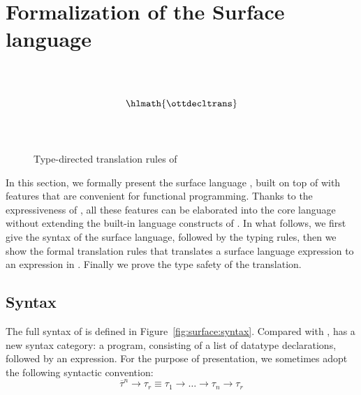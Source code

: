 \section{Formalization of the Surface language}
\label{sec:surface}

\begin{figure*}
\small
\centering
\renewcommand{\ottinterrule}{\\[1.0mm]}
\renewcommand{\ottdrule}[4][]{{\inferrule{#2 }{#3}\,\ottdrulename{#4}}}
\renewenvironment{ottdefnblock}[3][]{\raggedright \framebox{\mbox{#2}} \quad #3 \\[0pt]}{}
\renewcommand{\ottusedrule}[1]{$#1\quad$}
\ottdefnctxtrans{}\ottinterrule
\ottdefnpgmtrans{}\ottinterrule
\ottdefndecltrans{}
\[\hlmath{\ottdecltrans}\]\ottinterrule %
\ottdefnpattrans{}\ottinterrule
\setlength{\lineskip}{8pt}
\ottdefnexprtrans{}
\caption{Type-directed translation rules of \sufcc}
\label{fig:source:translate}
\end{figure*}


In this section, we formally present the surface language \sufcc,
built on top of \name with features that are convenient for functional
programming. Thanks to the expressiveness of \name, all these features
can be elaborated into the core language without extending the
built-in language constructs of \name. In what follows, we first give
the syntax of the surface language, followed by the typing rules, then
we show the formal translation rules that translates a surface
language expression to an expression in \name. Finally we prove the
type safety of the translation.

\subsection{Syntax}

The full syntax of \sufcc is defined in
Figure~\ref{fig:surface:syntax}. Compared with \name, \sufcc has a new
syntax category: a program, consisting of a list of datatype
declarations, followed by an expression. For the purpose of
presentation, we sometimes adopt the following syntactic convention:
\[
\overline{\tau}^n \rightarrow \tau_r \equiv \tau_1 \rightarrow \dots \rightarrow \tau_n \rightarrow \tau_r
\]

